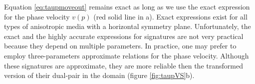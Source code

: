 %
%
%
%
%





Equation \ref{eq:taupmoveout} remains exact as long as we use the
exact expression for the phase velocity $v(p)$ (red solid line in
a). Exact expressions exist for all types of anisotropic
media with a horizontal symmetry plane. Unfortunately, the exact and
the highly accurate \citep{Stovas:SEG2010} expressions for \taup
signatures are not very practical because they depend on multiple
parameters. In practice, one may prefer to employ three-parameters
approximate relations for the phase velocity. Although these
signatures are approximate, they are more reliable then the \taup
transformed version of their dual-pair in the \tx domain (figure \ref{fig:taupVS}b). 


